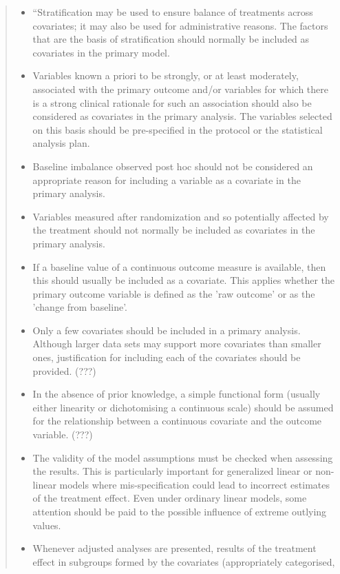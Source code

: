   \begin{quote}
    \begin{itemize}
\smaller
\item ``Stratification may be used to ensure balance of treatments across
covariates; it may also be used for administrative reasons.  The factors
that are the basis of stratification should normally be included as
covariates in the primary model.
\item Variables known a priori to be strongly, or at least moderately,
associated with the primary outcome and/or variables for which there is
a strong clinical rationale for such an association should also be
considered as covariates in the primary analysis.  The variables
selected on this basis should be pre-specified in the protocol or the
statistical analysis plan.
\item Baseline imbalance observed post hoc should not be considered an
appropriate reason for including a variable as a covariate in the
primary analysis.
\item Variables measured after randomization and so potentially affected by
the treatment should not normally be included as covariates in the
primary analysis.
\item If a baseline value of a continuous outcome measure is available, then
this should usually be included as a covariate.  This applies whether
the primary outcome variable is defined as the 'raw outcome' or as the
'change from baseline'.
\item Only a few covariates should be included in a primary analysis.
Although larger data sets may support more covariates than smaller ones,
justification for including each of the covariates should be
provided. (???)
\item In the absence of prior knowledge, a simple functional form (usually
either linearity or dichotomising a continuous scale) should be assumed
for the relationship between a continuous covariate and the outcome
variable. (???)
\item The validity of the model assumptions must be checked when assessing
the results.  This is particularly important for generalized linear or
non-linear models where mis-specification could lead to incorrect
estimates of the treatment effect.  Even under ordinary linear models,
some attention should be paid to the possible influence of extreme
outlying values.
\item Whenever adjusted analyses are presented, results of the treatment
effect in subgroups formed by the covariates (appropriately categorised,

\end{itemize}
\end{quote}
